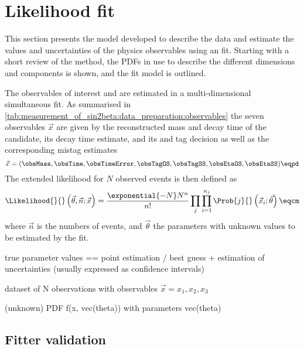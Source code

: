 
\section{Likelihood fit}
\label{sec:measurement_of_sin2beta:likelihood_fit}

This section presents the model developed to describe the data and estimate the
values and uncertainties of the physics observables using an \uEML fit. Starting
with a short review of the \uEML method, the \acp{PDF} in use to describe the
different dimensions and components is shown, and the fit model is outlined.

The \CP observables of interest \SJpsiKS and \CJpsiKS are estimated in a
multi-dimensional simultaneous \uEML fit. As summarised in
\cref{tab:measurement_of_sin2beta:data_preparation:observables} the seven
observables $\vec{x}$ are given by the reconstructed mass and decay time of the
\Bd candidate, its decay time estimate, and its \OS and \SSpi tag decision as
well as the corresponding mistag estimates
%
\begin{equation}\label{eq:measurement_of_sin2beta:likelihood_fit:observables}
  \vec{x} = (\obsMass, \obsTime, \obsTimeError, \obsTagOS, \obsTagSS, \obsEtaOS, \obsEtaSS)\eqpd  
\end{equation}
%
The extended likelihood for $N$ observed events is then defined as
%
\begin{equation}\label{sec:measurement_of_sin2beta:likelihood_fit:uEML}
  \Likelihood{}{}\left(\vec{\theta},\vec{n};\vec{x}\right) = \frac{\exponential{-N} N^n}{n!} \prod_j \prod_{i=1}^{n_j} \Prob{j}{}\left(\vec{x}_i;\vec{\theta}\right)\eqcm
\end{equation}
%
where $\vec{n}$ is the numbers of events, and $\vec{\theta}$ the parameters with
unknown values to be estimated by the \uEML fit.

\newpage
true parameter values == point estimation / best guess
+ estimation of uncertainties (usually expressed as confidence intervals)

dataset of N observations with observables $\vec{x} = {x_1, x_2, x_3}$

(unknown) PDF f(x, vec(theta)) with parameters vec(theta)




\subsection{Fitter validation}
\label{sec:measurement_of_sin2beta:likelihood_fit:validation}
